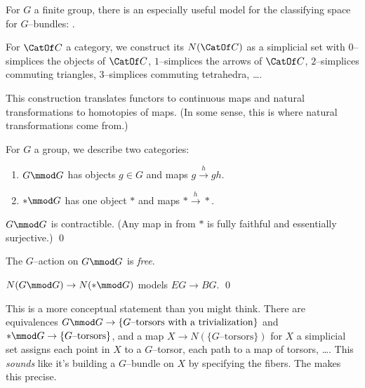 For $G$ a finite group, there is an especially useful model for the classifying space for $G$--bundles: .

\begin{definition}
For $\CatOf C$ a category, we construct its  $N(\CatOf C)$ as a simplicial set with $0$--simplices the objects of $\CatOf C$, $1$--simplices the arrows of $\CatOf C$, $2$--simplices commuting triangles, $3$--simplices commuting tetrahedra, \ldots .
\end{definition}

\begin{remark}
This construction translates functors to continuous maps and natural transformations to homotopies of maps.  (In some sense, this is where natural transformations come from.)
\end{remark}

\begin{example}
For $G$ a group, we describe two categories:
\begin{enumerate}
    \item $G \mmod G$ has objects $g \in G$ and maps $g \xrightarrow h gh$.
    \item $* \mmod G$ has one object $*$ and maps $* \xrightarrow h *$.
\end{enumerate}
\end{example}

\begin{lemma}
$G \mmod G$ is contractible.  (Any map in from $*$ is fully faithful and essentially surjective.) \qed
\end{lemma}

\begin{remark}
The $G$--action on $G \mmod G$ is \emph{free}.
\end{remark}

\begin{corollary}
$N(G \mmod G) \to N(* \mmod G)$ models $EG \to BG$. \qed
\end{corollary}

\begin{remark}
This is a more conceptual statement than you might think.  There are equivalences $G \mmod G \to \{\text{$G$--torsors with a trivialization}\}$ and $* \mmod G \to \{\text{$G$--torsors}\}$, and a map $X \to N(\{\text{$G$--torsors}\})$ for $X$ a simplicial set assigns each point in $X$ to a $G$--torsor, each path to a map of torsors, \ldots .  This \emph{sounds} like it's building a $G$--bundle on $X$ by specifying the fibers.  The  makes this precise.
\end{remark}

